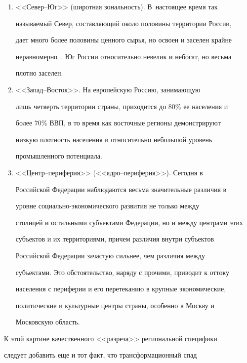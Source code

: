     \begin{enumerate}[1.]


\item <<Север--Юг>> (широтная зональность). В~настоящее время так


называемый Север, составляющий около половины территории России,


дает много более половины ценного сырья, но освоен и заселен крайне


неравномерно~\cite{4-luc}. Юг России относительно невелик и небогат, но весьма


плотно заселен.


    \item  <<Запад--Восток>>. На европейскую Россию, занимающую


лишь четверть территории страны, приходится до 80\% ее населения и


более 70\% ВВП, в то время как восточные регионы демонстрируют


низкую плотность населения и относительно небольшой уровень


промышленного потенциала.


    \item  <<Центр--периферия>> (<<ядро--периферия>>). Сегодня в


Российской Федерации наблюдаются весьма значительные различия в


уровне со\-ци\-аль\-но-эко\-но\-ми\-че\-ско\-го развития не только между


столицей и остальными субъектами Федерации, но и между центрами этих


субъектов и их территориями, причем различия внутри субъектов


Российской Федерации зачастую сильнее, чем различия между


субъектами. Это обстоятельство, наряду с прочими, приводит к оттоку


населения с периферии и его перетеканию в крупные экономические,


политические и культурные центры страны, особенно в Москву и


Московскую область.


    \end{enumerate}





    К этой картине качественного <<разреза>> региональной специфики


следует добавить еще и тот факт, что трансформационный спад


